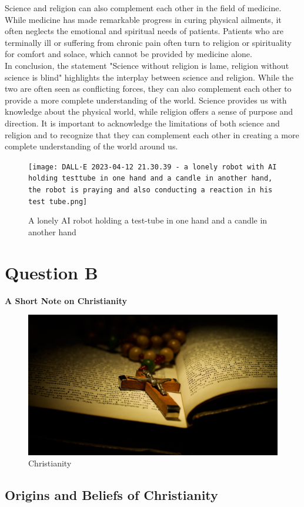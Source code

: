 \documentclass[11pt]{article}
\begin{document}
Science and religion can also complement each other in the field of medicine. While medicine has made remarkable progress in curing physical ailments, it often neglects the emotional and spiritual needs of patients. Patients who are terminally ill or suffering from chronic pain often turn to religion or spirituality for comfort and solace, which cannot be provided by medicine alone.\\

In conclusion, the statement "Science without religion is lame, religion without science is blind" highlights the interplay between science and religion. While the two are often seen as conflicting forces, they can also complement each other to provide a more complete understanding of the world. Science provides us with knowledge about the physical world, while religion offers a sense of purpose and direction. It is important to acknowledge the limitations of both science and religion and to recognize that they can complement each other in creating a more complete understanding of the world around us.\\


\begin{figure}[H]
	\centering
	\texttt{[image: DALL·E 2023-04-12 21.30.39 - a lonely robot with AI holding testtube in one hand and a candle in another hand, the robot is praying and also conducting a reaction in his test tube.png]}
	\caption{A lonely AI robot holding a test-tube in one hand and a candle in another hand}
\end{figure}

\section{Question B}
\textbf{A Short Note on Christianity}

\begin{figure}[H]
	\centering
	\includegraphics[width=.45\textwidth]{christianity-gettyimages-121153575.jpg}
	\caption{Christianity}
\end{figure}

\subsection{Origins and Beliefs of Christianity}
\end{document}
